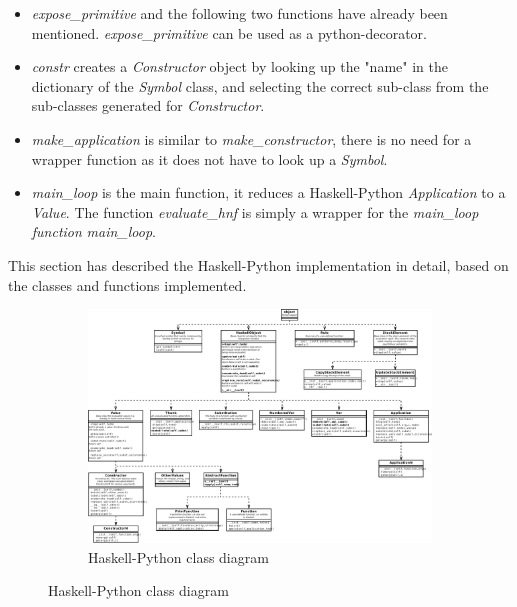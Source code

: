 \begin{itemize}

\item \emph{expose\_primitive} and the following two functions have already been 
mentioned. \emph{expose\_primitive} can be used as a python-decorator.

\item \emph{constr} creates a \emph{Constructor} object by looking up the "name" in
the dictionary of the \emph{Symbol} class, and selecting the correct sub-class from the
sub-classes generated for \emph{Constructor}.

\item \emph{make\_application} is similar to \emph{make\_constructor}, there is no
need for a wrapper function as it does not have to look up a \emph{Symbol}.

\item \emph{main\_loop} is the main function, it reduces a Haskell-Python 
\emph{Application} to a \emph{Value}. The function \emph{evaluate\_hnf} is
simply a wrapper for the \emph{main\_loop function}
\emph{main\_loop}.

\end{itemize}

This section has described the Haskell-Python implementation in detail, based
on the classes and functions implemented.

\begin{figure}
\begin{figure}[H]
\centering
\includegraphics[width=\textheight]{../diags/core-interp.pdf}

\caption{Haskell-Python class diagram}
\label{fig:coreinterp}

\end{figure}
\end{figure}

